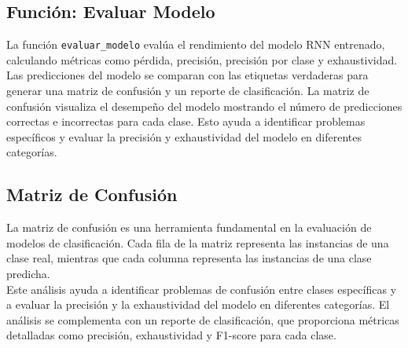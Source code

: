 \subsection{Función: Evaluar Modelo}
La función \texttt{evaluar\_modelo} evalúa el rendimiento del modelo RNN entrenado, calculando métricas como pérdida, precisión, precisión por clase y exhaustividad.\\

Las predicciones del modelo se comparan con las etiquetas verdaderas para generar una matriz de confusión y un reporte de clasificación. La matriz de confusión visualiza el desempeño del modelo mostrando el número de predicciones correctas e incorrectas para cada clase. Esto ayuda a identificar problemas específicos y evaluar la precisión y exhaustividad del modelo en diferentes categorías.

\subsection{Matriz de Confusión}
La matriz de confusión es una herramienta fundamental en la evaluación de modelos de clasificación. Cada fila de la matriz representa las instancias de una clase real, mientras que cada columna representa las instancias de una clase predicha.\\

Este análisis ayuda a identificar problemas de confusión entre clases específicas y a evaluar la precisión y la exhaustividad del modelo en diferentes categorías. El análisis se complementa con un reporte de clasificación, que proporciona métricas detalladas como precisión, exhaustividad y F1-score para cada clase.

